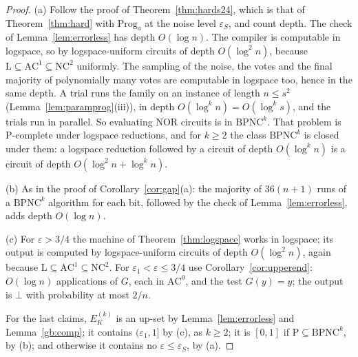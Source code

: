 \documentclass[11pt]{amsart}
\theoremstyle{definition}
\theoremstyle{remark}
\newcommand{\eps}{\varepsilon}
\begin{document}
\begin{proof}
(a) Follow the proof of Theorem~\ref{thm:hards24}, which is that of Theorem~\ref{thm:hard} with
$\mathrm{Prog}_a$ at the noise level $\eps_S$, and count depth. The check of Lemma~\ref{lem:errorless} has depth
$O(\log n)$. The compiler is computable in logspace, so by logspace-uniform circuits of depth
$O(\log^2n)$, because $\mathrm L\subseteq\mathrm{AC}^1\subseteq\mathrm{NC}^2$ uniformly. The
sampling of the noise, the votes and the final majority of polynomially many votes are computable
in logspace too, hence in the same depth. A trial runs the family on an instance of length $n\le s^2$
(Lemma~\ref{lem:paramprog}(iii)), in depth $O(\log^kn)=O(\log^ks)$, and the trials run in parallel.
So evaluating NOR circuits is in $\mathrm{BPNC}^k$. That problem is P-complete under logspace
reductions, and for $k\ge2$ the class $\mathrm{BPNC}^k$ is closed under them: a logspace
reduction followed by a circuit of depth $O(\log^kn)$ is a circuit of depth
$O(\log^2n+\log^kn)$.

(b) As in the proof of Corollary~\ref{cor:gap}(a): the majority of $36(n+1)$ runs of a
$\mathrm{BPNC}^k$ algorithm for each bit, followed by the check of Lemma~\ref{lem:errorless}, adds
depth $O(\log n)$.

(c) For $\eps>3/4$ the machine of Theorem~\ref{thm:logspace} works in logspace; its output is
computed by logspace-uniform circuits of depth $O(\log^2n)$, again because
$\mathrm L\subseteq\mathrm{AC}^1\subseteq\mathrm{NC}^2$. For $\eps_1<\eps\le3/4$ use
Corollary~\ref{cor:upperend}: $O(\log n)$ applications of $G$, each in $\mathrm{AC}^0$, and the test
$G(y)=y$; the output is $\bot$ with probability at most $2/n$.

For the last claims, $E^{(k)}_K$ is an up-set by Lemma~\ref{lem:errorless} and
Lemma~\ref{gb:comp}; it contains $(\eps_1,1]$ by (c), as $k\ge2$; it is $[0,1]$ if
$\mathrm P\subseteq\mathrm{BPNC}^k$, by (b); and otherwise it contains no $\eps\le\eps_S$, by (a).
\end{proof}
\end{document}
